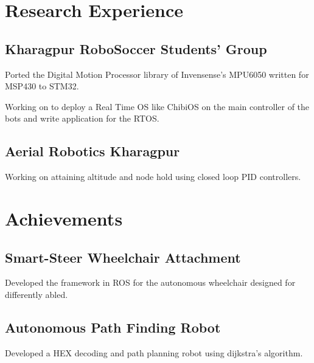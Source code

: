 \documentclass[]{cvclass}
\begin{document}
\begin{minipage}[t]{0.45\textwidth} 

\section{Research Experience}

\subsection{Kharagpur RoboSoccer Students' Group}
\separation
\separation
\begin{smallBullet}
\item Ported the Digital Motion Processor library of Invensense's MPU6050 written for MSP430 to STM32.
\item Working on to deploy a Real Time OS like ChibiOS on the main controller of the bots and write application for the RTOS.
\end{smallBullet}

\separation

\subsection{Aerial Robotics Kharagpur}
\separation
\begin{smallBullet}
\item Working on attaining altitude and node hold using closed loop PID controllers.
\end{smallBullet}

\section{Achievements}

\subsection{Smart-Steer Wheelchair Attachment}
\separation
\begin{smallBullet}
\item Developed the framework in ROS for the autonomous wheelchair designed for differently abled.
\end{smallBullet}

\subsection{Autonomous Path Finding Robot}
\separation
\begin{smallBullet}
\item Developed a HEX decoding and path planning robot using dijkstra's algorithm.
\end{smallBullet}


\end{minipage}
\end{document}
